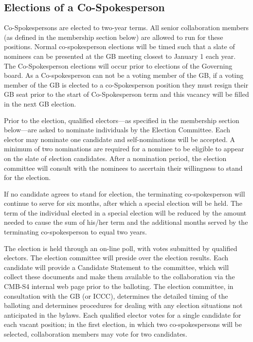 \documentclass[12pt]{article}
\begin{document}
\subsection{Elections of a Co-Spokesperson}

Co-Spokespersons are elected to two-year terms. All senior collaboration members (as defined in the membership section below) are allowed to run for these positions.  Normal co-spokesperson elections will be timed such that a slate of nominees can be presented at the GB meeting closest to January 1 each year. The Co-Spokesperson elections will occur prior to elections of the Governing board. As a Co-spokesperson can not be a voting member of the GB, if a voting member of the GB is elected to a co-Spokesperson position they must resign their GB seat prior to the start of Co-Spokesperson term and this vacancy will be filled in the next GB election. 

Prior to the election, qualified electors---as specified in the membership section below---are asked to nominate individuals by the Election Committee. Each elector may nominate one candidate and self-nominations will be accepted. A minimum of two nominations are required for a nominee to be eligible to appear on the slate of election candidates. After a nomination period, the election committee  will consult with the nominees to ascertain their willingness to stand for the election.

If no candidate agrees to stand for election, the terminating co-spokesperson will continue to serve for six months, after which a special election will be held. The term of the individual elected in a special election will be reduced by the amount needed to cause the sum of his/her term and the additional months served by the terminating co-spokesperson to equal two years.

The election is held through an on-line poll, with votes submitted by qualified electors. The election committee will preside over the election results. Each candidate will provide a Candidate Statement to the committee, which will collect these documents and make them available to the collaboration via the CMB-S4 internal web page prior to the balloting. The election committee, in consultation with the GB (or ICCC), determines the detailed timing of the balloting and determines procedures for dealing with any election situations not anticipated in the bylaws. Each qualified elector votes for a single candidate for each vacant position; in the first election, in which two co-spokespersons will be selected, collaboration members may vote for two candidates. 
\end{document}
